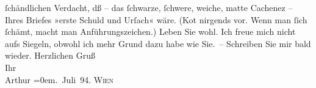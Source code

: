 \begin{ledgroupsized}[t]{13cm}
               ſchändlichen Ver{\pb}dacht, dß – das ſchwarze, ſchwere,
               weiche, matte Cachenez – Ihres Briefes »erste Schuld und Urſach« wäre. (Ko{\geminationm}t nirgends vor. Wenn man ſich ſchämt, macht man
               Anführungszeichen.)\pend
           \pstart
           Leben Sie wohl. Ich freue {\pb}mich nicht aufs Siegeln,
               obwohl ich mehr Grund dazu habe wie Sie. –\pend
           \pstart
           Schreiben Sie mir bald wieder. Herzlichen Gruß{\\[\baselineskip]}Ihr{\\[\baselineskip]}\spacefill\mbox{Arthur}\pend
           \leftskip=0em{}. Juli 94. \textsc{Wien}\pend
           
         
         \endnumbering{}\end{ledgroupsized}  \newcommand{\dateiname}{L00343}\newcommand{\titel}{Arthur Schnitzler an Richard Beer-Hofmann, 2. 7. 1894}\newcommand{\editorInnen}{ Martin Anton Müller und Gerd-Hermann Susen}
      